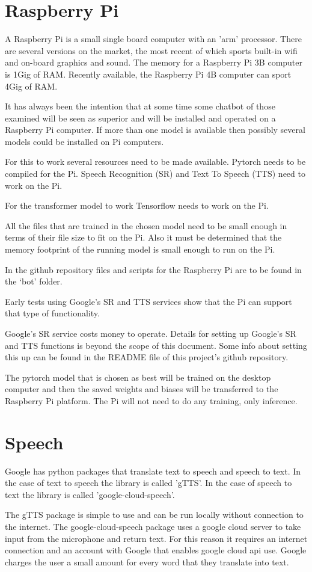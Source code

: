 \section{Raspberry Pi}

A Raspberry Pi is a small single board computer with an 'arm' processor. There are 
several versions on the market, the most recent of which sports built-in wifi and
on-board graphics and sound. The memory for a Raspberry Pi 3B computer is 1Gig of RAM. Recently
available, the Raspberry Pi 4B computer can sport 4Gig of RAM.

It has always been the intention that at some time some chatbot of
those examined will be seen as superior and will be installed and
operated on a Raspberry Pi computer. If more than one model is available
then possibly several models could be installed on Pi computers.

For this to work several resources need to be made available. Pytorch
needs to be compiled for the Pi. Speech Recognition (SR) and Text
To Speech (TTS) need to work on the Pi.

For the transformer model to work Tensorflow needs to work on the Pi.

All the files that are trained in the chosen model need to be small
enough in terms of their file size to fit on the Pi. Also it must
be determined that the memory footprint of the running model is small
enough to run on the Pi.

In the github repository files and scripts for the Raspberry Pi are
to be found in the \textquoteleft bot\textquoteright{} folder.

Early tests using Google\textquoteright s SR and TTS services show
that the Pi can support that type of functionality. 

Google's SR service costs money to operate. Details
for setting up Google's SR and TTS functions is beyond
the scope of this document. Some info about setting this up can be
found in the README file of this project\textquoteright s github
repository.

The pytorch model that is chosen as best will be trained on the
desktop computer and then the saved weights and biases will be transferred
to the Raspberry Pi platform. The Pi will not need to do any training,
only inference. 



\section{Speech}

Google has python packages that translate text to speech and speech to text. In the case of text
to speech the library is called 'gTTS'. In the case of speech to text the library is called 'google-cloud-speech'. 

The gTTS package is simple to use and can be run locally without connection to the internet. The google-cloud-speech package uses a google cloud server to take input from the microphone and 
return text. For this reason it requires an internet connection and an account with Google that
enables google cloud api use. Google charges the user a small amount for every word that they
translate into text. 

